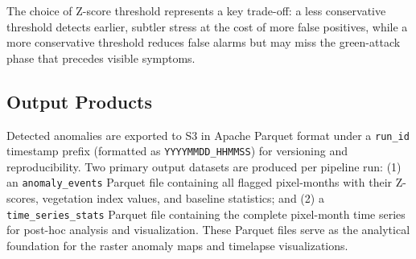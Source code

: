 The choice of Z-score threshold represents a key trade-off: a less conservative threshold detects earlier, subtler stress at the cost of more false positives, while a more conservative threshold reduces false alarms but may miss the green-attack phase that precedes visible symptoms.

\subsection{Output Products}

Detected anomalies are exported to S3 in Apache Parquet format under a \texttt{run\_id} timestamp prefix (formatted as \texttt{YYYYMMDD\_HHMMSS}) for versioning and reproducibility. Two primary output datasets are produced per pipeline run: (1) an \texttt{anomaly\_events} Parquet file containing all flagged pixel-months with their Z-scores, vegetation index values, and baseline statistics; and (2) a \texttt{time\_series\_stats} Parquet file containing the complete pixel-month time series for post-hoc analysis and visualization. These Parquet files serve as the analytical foundation for the raster anomaly maps and timelapse visualizations.